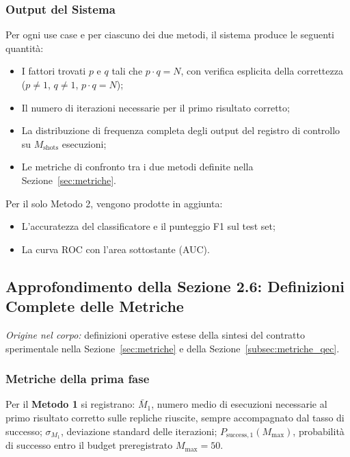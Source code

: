 \begin{onehalfspace}
\subsubsection{Output del Sistema}

Per ogni use case e per ciascuno dei due metodi, il sistema produce le seguenti quantità:

\begin{itemize}
    \item I fattori trovati $p$ e $q$ tali che $p \cdot q = N$, con verifica esplicita della correttezza ($p \neq 1$, $q \neq 1$, $p \cdot q = N$);
    \item Il numero di iterazioni necessarie per il primo risultato corretto;
    \item La distribuzione di frequenza completa degli output del registro di controllo su $M_{\text{shots}}$ esecuzioni;
    \item Le metriche di confronto tra i due metodi definite nella Sezione~\ref{sec:metriche}.
\end{itemize}

Per il solo Metodo 2, vengono prodotte in aggiunta:
\begin{itemize}
    \item L'accuratezza del classificatore e il punteggio F1 sul test set;
    \item La curva ROC con l'area sottostante (\ac{AUC}).
\end{itemize}

\subsection{Approfondimento della Sezione 2.6: Definizioni Complete delle Metriche}
\label{app:obiettivi:metriche}

\noindent\textit{Origine nel corpo:} definizioni operative estese della
sintesi del contratto sperimentale nella Sezione~\ref{sec:metriche} e della
Sezione~\ref{subsec:metriche_qec}.

\subsubsection{Metriche della prima fase}

Per il \textbf{Metodo 1} si registrano: $\bar{M}_1$, numero medio di esecuzioni necessarie al primo risultato corretto sulle repliche riuscite, sempre accompagnato dal tasso di successo; $\sigma_{M_1}$, deviazione standard delle iterazioni; $P_{\mathrm{success},1}(M_{\max})$, probabilità di successo entro il budget preregistrato $M_{\max}=50$.


\end{onehalfspace}
